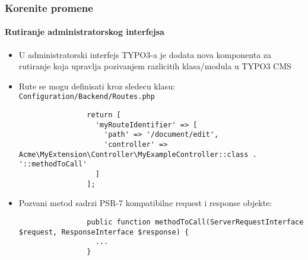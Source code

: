 \begin{frame}[fragile]
	\frametitle{Korenite promene}
	\framesubtitle{Rutiranje administratorskog interfejsa}

	\lstset{basicstyle=\tiny\ttfamily}

	\begin{itemize}

		\item U administratorski interfejs TYPO3-a je dodata nova komponenta za rutiranje koja upravlja pozivanjem razlicitih klasa/modula u TYPO3 CMS

		\item Rute se mogu definisati kroz sledecu klasu:\newline
			\small
				\texttt{Configuration/Backend/Routes.php}
			\normalsize

			\begin{lstlisting}
				return [
				  'myRouteIdentifier' => [
				    'path' => '/document/edit',
				    'controller' => Acme\MyExtension\Controller\MyExampleController::class . '::methodToCall'
				  ]
				];
			\end{lstlisting}

		\item Pozvani metod sadrzi PSR-7 kompatibilne request i response objekte:

			\begin{lstlisting}
				public function methodToCall(ServerRequestInterface $request, ResponseInterface $response) {
				  ...
				}
			\end{lstlisting}

	\end{itemize}

\end{frame}


